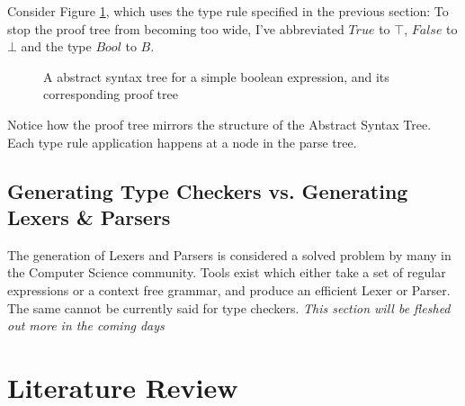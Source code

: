 \documentclass{UoYCSproject}
\begin{document}
Consider Figure \ref{fig:ParseAndProofTree}, which uses the
type rule specified in the previous section:
To stop the proof tree from becoming too wide, I've abbreviated $True$ to $\top$,
$False$ to $\bot$ and the type $Bool$ to $B$.
\begin{figure}
    \caption{A abstract syntax tree for a simple boolean expression, and its corresponding proof tree}
    \label{fig:ParseAndProofTree}
\end{figure}
Notice how the proof tree mirrors the structure of the Abstract Syntax Tree.
Each type rule application happens at a node in the parse tree.

\section{Generating Type Checkers vs. Generating Lexers \& Parsers}
The generation of Lexers and Parsers is considered a solved problem by many in
the Computer Science community. Tools exist which either take a set of regular
expressions or a context free grammar, and produce an efficient Lexer or
Parser. The same cannot be currently said for type checkers. \textit{This
    section will be fleshed out more in the coming days}


\chapter{Literature Review}
\end{document}

